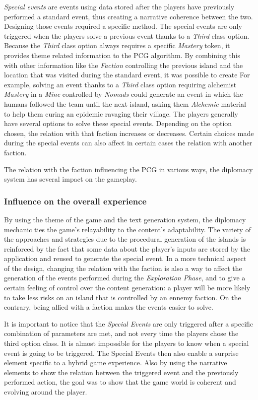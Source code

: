 \textit{Special events} are events using data stored after the players have previously performed a standard event, thus creating a narrative coherence between the two. Designing those events required a specific method. The special events are only triggered when the players solve a previous event thanks to a \textit{Third} class option. Because the \textit{Third} class option always requires a specific \textit{Mastery} token, it provides theme related information to the PCG algorithm. By combining this with other information like the \textit{Faction} controlling the previous island and the location that was visited during the standard event, it was possible to create  For example, solving an event thanks to a \textit{Third} class option requiring  alchemist \textit{Mastery}  in a \textit{Mine} controlled by \textit{Nomads} could generate an event in which the humans followed the team until the next island, asking them \textit{Alchemic} material to help them curing an epidemic ravaging their village. The players generally have several options to solve these special events. Depending on the option chosen, the relation with that faction increases or decreases. Certain choices made during the special events can also affect in certain cases the relation with another faction.

The relation with the faction influencing the PCG in various ways, the diplomacy system has several impact on the gameplay. 
\subsubsection{Influence on the overall experience}
By using the theme of the game and the text generation system, the diplomacy mechanic ties the game's relayability to the content's adaptability. The variety of the approaches and strategies due to the procedural generation of the islands is reinforced by the fact that some data about the player's inputs are stored by the application and reused to generate the special event. 
In a more technical aspect of the design, changing the relation with the faction is also a way to affect the generation of the events performed during the \textit{Exploration Phase}, and to give a certain feeling of control over the content generation: a player will be more likely to take less risks on an island that is controlled by an ennemy faction. On the contrary, being allied with a faction makes the events easier to solve.

It is important to notice that the \textit{Special Events} are only triggered after a specific combination of parameters are met, and not every time the players chose the third option class. It is almost impossible for the players to know when a special event is going to be triggered. The Special Events then also enable a surprise element specific to a hybrid game experience. Also by using the narrative elements to show the relation between the triggered event and the previously performed action, the goal was to show that the game world is coherent and evolving around the player. 
